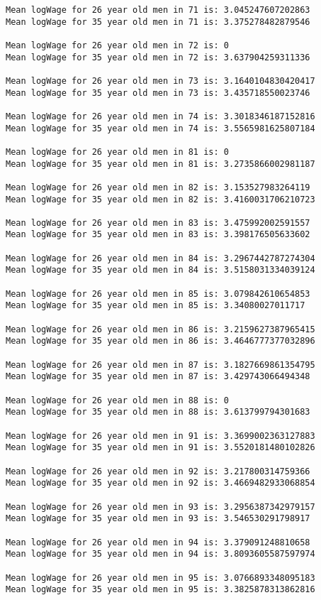 \documentclass[11pt]{article}
\begin{document}
\begin{Verbatim}[commandchars=\\\{\}]
Mean logWage for 26 year old men in 71 is: 3.045247607202863
Mean logWage for 35 year old men in 71 is: 3.375278482879546

Mean logWage for 26 year old men in 72 is: 0
Mean logWage for 35 year old men in 72 is: 3.637904259311336

Mean logWage for 26 year old men in 73 is: 3.1640104830420417
Mean logWage for 35 year old men in 73 is: 3.435718550023746

Mean logWage for 26 year old men in 74 is: 3.3018346187152816
Mean logWage for 35 year old men in 74 is: 3.5565981625807184

Mean logWage for 26 year old men in 81 is: 0
Mean logWage for 35 year old men in 81 is: 3.2735866002981187

Mean logWage for 26 year old men in 82 is: 3.153527983264119
Mean logWage for 35 year old men in 82 is: 3.4160031706210723

Mean logWage for 26 year old men in 83 is: 3.475992002591557
Mean logWage for 35 year old men in 83 is: 3.398176505633602

Mean logWage for 26 year old men in 84 is: 3.2967442787274304
Mean logWage for 35 year old men in 84 is: 3.5158031334039124

Mean logWage for 26 year old men in 85 is: 3.079842610654853
Mean logWage for 35 year old men in 85 is: 3.34080027011717

Mean logWage for 26 year old men in 86 is: 3.2159627387965415
Mean logWage for 35 year old men in 86 is: 3.4646777377032896

Mean logWage for 26 year old men in 87 is: 3.1827669861354795
Mean logWage for 35 year old men in 87 is: 3.429743066494348

Mean logWage for 26 year old men in 88 is: 0
Mean logWage for 35 year old men in 88 is: 3.613799794301683

Mean logWage for 26 year old men in 91 is: 3.3699002363127883
Mean logWage for 35 year old men in 91 is: 3.5520181480102826

Mean logWage for 26 year old men in 92 is: 3.217800314759366
Mean logWage for 35 year old men in 92 is: 3.4669482933068854

Mean logWage for 26 year old men in 93 is: 3.2956387342979157
Mean logWage for 35 year old men in 93 is: 3.546530291798917

Mean logWage for 26 year old men in 94 is: 3.379091248810658
Mean logWage for 35 year old men in 94 is: 3.8093605587597974

Mean logWage for 26 year old men in 95 is: 3.0766893348095183
Mean logWage for 35 year old men in 95 is: 3.3825878313862816


    \end{Verbatim}
\end{document}
